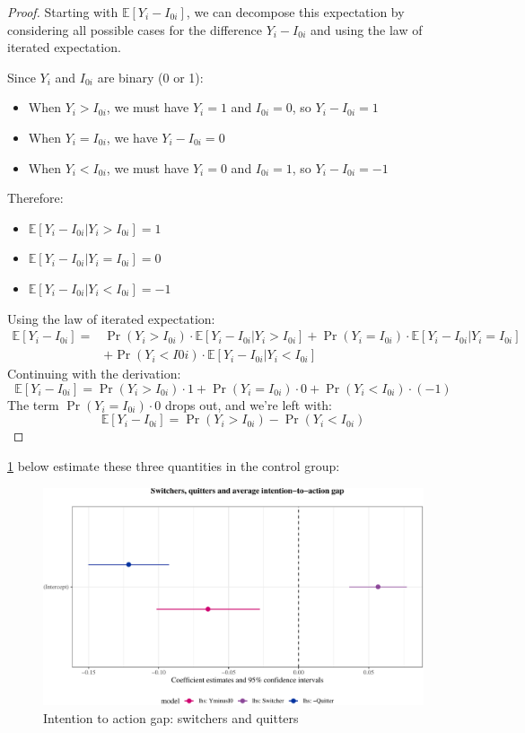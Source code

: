\documentclass[
]{article}
\providecommand{\tightlist}{%
  \setlength{\itemsep}{0pt}\setlength{\parskip}{0pt}}
\newcommand{\esp}[1]{\mathds{E}[ #1 ]}
\theoremstyle{definition}
\theoremstyle{definition}
\theoremstyle{definition}
\theoremstyle{definition}
\theoremstyle{remark}
\begin{document}
\begin{proof}
Starting with \(\mathbb{E}[Y_i - I_{0i}]\), we can decompose this expectation by considering all possible cases for the difference \(Y_i - I_{0i}\) and using the law of iterated expectation.

Since \(Y_i\) and \(I_{0i}\) are binary (0 or 1):

\begin{itemize}
\tightlist
\item
  When \(Y_i > I_{0i}\), we must have \(Y_i = 1\) and \(I_{0i} = 0\), so \(Y_i - I_{0i} = 1\)
\item
  When \(Y_i = I_{0i}\), we have \(Y_i - I_{0i} = 0\)
\item
  When \(Y_i < I_{0i}\), we must have \(Y_i = 0\) and \(I_{0i} = 1\), so \(Y_i - I_{0i} = -1\)
\end{itemize}

Therefore:

\begin{itemize}
\tightlist
\item
  \(\mathbb{E}[Y_i - I_{0i} | Y_i > I_{0i}] = 1\)
\item
  \(\mathbb{E}[Y_i - I_{0i} | Y_i = I_{0i}] = 0\)
\item
  \(\mathbb{E}[Y_i - I_{0i} | Y_i < I_{0i}] = -1\)
\end{itemize}

Using the law of iterated expectation:
\[
\begin{aligned}
\esp{Y_i - I_{0i}} = &\Pr(Y_i > I_{0i}) \cdot \mathbb{E}[Y_i - I_{0i} | Y_i > I_{0i}] + \Pr(Y_i = I_{0i}) \cdot \mathbb{E}[Y_i - I_{0i} | Y_i = I_{0i}] \\
 &+ \Pr(Y_i < I{0i}) \cdot \mathbb{E}[Y_i - I_{0i} | Y_i < I_{0i}]
\end{aligned}
\]
Continuing with the derivation:
\[
\mathbb{E}[Y_i - I_{0i}] = \Pr(Y_i > I_{0i}) \cdot 1 + \Pr(Y_i = I_{0i}) \cdot 0 + \Pr(Y_i < I_{0i}) \cdot (-1)
\]
The term \(\Pr(Y_i = I_{0i}) \cdot 0\) drops out, and we're left with:
\[
\mathbb{E}[Y_i - I_{0i}] = \Pr(Y_i > I_{0i}) - \Pr(Y_i < I_{0i})
\]
\end{proof}

\ref{fig:figQuitters} below estimate these three quantities in the control group:

\begin{figure}
\centering
\includegraphics{Theory_files/figure-latex/figQuitters-1.pdf}
\caption{\label{fig:figQuitters}Intention to action gap: switchers and quitters}
\end{figure}
\end{document}
